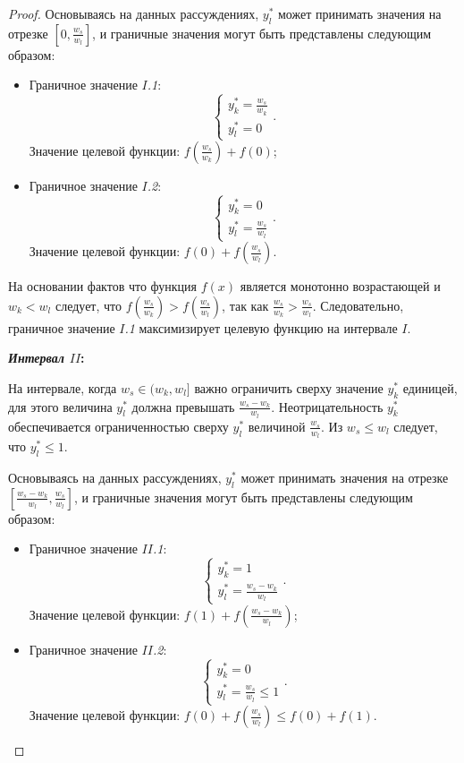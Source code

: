 \begin{proof}
Основываясь на данных рассуждениях, $y_l^{*}$ может принимать значения на отрезке $\left[0, \frac{w_s}{w_l}\right]$, и граничные значения могут быть представлены следующим образом:
\begin{itemize}
	\item Граничное значение \textit{$I$.1}:
		$$\begin{cases}
		y_k^{*} = \frac{w_s}{w_k}\\
		y_l^{*} = 0
		\end{cases}.$$
		Значение целевой функции: $f\left(\frac{w_s}{w_k}\right) + f(0)$;
	\item Граничное значение \textit{$I$.2}:
		$$\begin{cases}
		y_k^{*} = 0\\
		y_l^{*} = \frac{w_s}{w_l}
		\end{cases}.$$
		Значение целевой функции: $f(0) + f\left(\frac{w_s}{w_l}\right)$.
\end{itemize}

На основании фактов что функция $f(x)$ является монотонно возрастающей и $w_k < w_l$ следует, что $f\left(\frac{w_s}{w_k}\right) > f\left(\frac{w_s}{w_l}\right)$, так как $\frac{w_s}{w_k} > \frac{w_s}{w_l}$. Следовательно, граничное значение \textit{$I$.1} максимизирует целевую функцию на интервале $I$.

\textbf{\textit{Интервал $II$}:}

На интервале, когда $w_s \in (w_k, w_l]$ важно ограничить сверху значение $y_k^{*}$ единицей, для этого величина $y_l^{*}$ должна превышать $\frac{w_s - w_k}{w_l}$. Неотрицательность $y_k^{*}$ обеспечивается ограниченностью сверху $y_l^{*}$ величиной $\frac{w_s}{w_l}$. Из $w_s \leq w_l$ следует, что $y_l^{*} \leq 1$.

Основываясь на данных рассуждениях, $y_l^{*}$ может принимать значения на отрезке $\left[\frac{w_s - w_k}{w_l}, \frac{w_s}{w_l}\right]$, и граничные значения могут быть представлены следующим образом:

\begin{itemize}
	\item Граничное значение \textit{$II$.1}:
		$$\begin{cases}
		y_k^{*} = 1 \\
		y_l^{*} = \frac{w_s - w_k}{w_l}
		\end{cases}.$$
		Значение целевой функции: $f(1) + f\left(\frac{w_s - w_k}{w_l}\right)$;
	\item Граничное значение \textit{$II$.2}:
		$$\begin{cases}
		y_k^{*} = 0\\
		y_l^{*} = \frac{w_s}{w_l} \leq 1
		\end{cases}.$$
		Значение целевой функции: $f(0) + f\left(\frac{w_s}{w_l}\right) \leq f(0) + f(1)$.
\end{itemize}


\end{proof}
